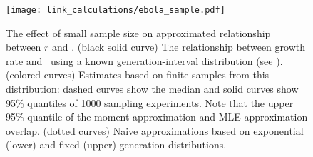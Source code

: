 \begin{figure}[htbp] \centering
	\texttt{[image: link\_calculations/ebola\_sample.pdf]}
\caption{
%
The effect of small sample size on approximated relationship between $r$ and \RR.
(black solid curve) The relationship between growth rate and \RR~using a known generation-interval distribution (see ).
(colored curves) Estimates based on finite samples from this distribution: dashed curves show the median and solid curves show 95\% quantiles of 1000 sampling experiments.
Note that the upper 95\% quantile of the moment approximation and MLE approximation overlap.
(dotted curves) Naive approximations based on exponential (lower) and fixed (upper) generation distributions.
%
}
	\label{fig:ebolaSample}
\end{figure}
